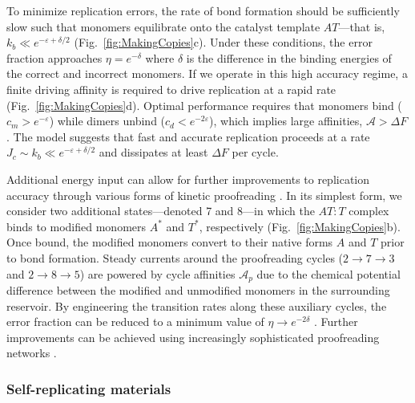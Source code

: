 \begin{appendices}
To minimize replication errors, the rate of bond formation should be sufficiently slow such that monomers equilibrate onto the catalyst template $AT$---that is, $k_b\ll e^{-\varepsilon + \delta/2}$ (Fig.~\ref{fig:MakingCopies}c). Under these conditions, the error fraction approaches $\eta = e^{-\delta}$ where $\delta$ is the difference in the binding energies of the correct and incorrect monomers.  If we operate in this high accuracy regime, a finite driving affinity is required to drive replication at a rapid rate (Fig.~\ref{fig:MakingCopies}d).  Optimal performance requires that monomers bind ($c_m>e^{-\varepsilon}$) while dimers unbind ($c_d<e^{-2\varepsilon}$), which implies large affinities, $\mathcal{A}>\Delta F$.  The model suggests that fast and accurate replication proceeds at a rate $J_c\sim k_b\ll e^{-\varepsilon+\delta/2}$ and dissipates at least $\Delta F$ per cycle. 

Additional energy input can allow for further improvements to replication accuracy through various forms of kinetic proofreading \cite{Hopfield1974, Murugan2012}.  In its simplest form, we consider two additional states---denoted 7 and 8---in which the $AT:T$ complex binds to modified monomers $A^*$ and $T^*$, respectively (Fig.~\ref{fig:MakingCopies}b). Once bound, the modified monomers convert to their native forms $A$ and $T$ prior to bond formation.  Steady currents around the proofreading cycles ($2\rightarrow7\rightarrow3$ and $2\rightarrow8\rightarrow5$) are powered by cycle affinities $\mathcal{A}_p$ due to the chemical potential difference between the modified and unmodified monomers in the surrounding reservoir.  By engineering the transition rates along these auxiliary cycles, the error fraction can be reduced to a minimum value of $\eta\rightarrow e^{-2\delta}$ \cite{Hartich2015}. Further improvements can be achieved using increasingly sophisticated proofreading networks \cite{Murugan2012}.

\subsubsection{Self-replicating materials}


\end{appendices}
